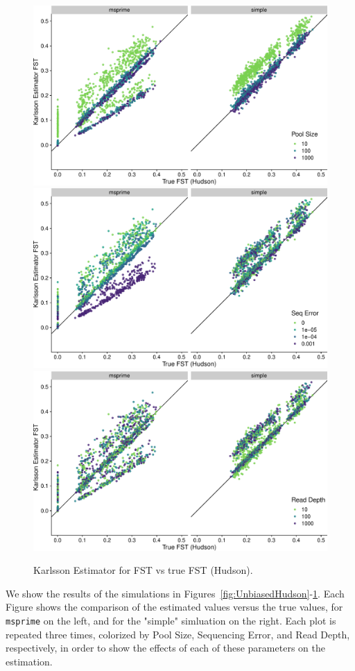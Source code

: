 \documentclass[a4paper,fontsize=9pt,DIV=14]{scrartcl}
\begin{document}
\begin{figure}[p]
    \centering
    \includegraphics[width=.75\linewidth]{true_hudson_fst-est_karlsson-pool_size.pdf}
    \includegraphics[width=.75\linewidth]{true_hudson_fst-est_karlsson-seq_error.pdf}
    \includegraphics[width=.75\linewidth]{true_hudson_fst-est_karlsson-read_depth.pdf}
    \vspace*{-1em}
    \caption{
        Karlsson Estimator for FST vs true FST (Hudson).
    }
\label{fig:Karlsson}
\end{figure}

We show the results of the simulations in Figures~\ref{fig:UnbiasedHudson}-\ref{fig:Karlsson}. Each Figure shows the comparison of the estimated values versus the true values, for \texttt{msprime} on the left, and for the "simple" simluation on the right. Each plot is repeated three times, colorized by Pool Size, Sequencing Error, and Read Depth, respectively, in order to show the effects of each of these parameters on the estimation.
\end{document}
